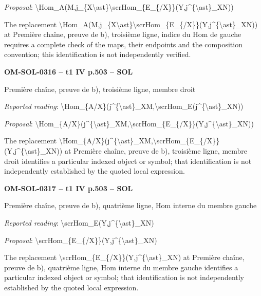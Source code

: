 \emph{Proposal}: \textbackslash{}Hom\_A(M,j\_\{X\textbackslash{}ast\}\textbackslash{}scrHom\_\{E\_\{/X\}\}(Y,j\textasciicircum{}\{\textbackslash{}ast\}\_XN))\par
The replacement \textbackslash{}Hom\_A(M,j\_\{X\textbackslash{}ast\}\textbackslash{}scrHom\_\{E\_\{/X\}\}(Y,j\textasciicircum{}\{\textbackslash{}ast\}\_XN)) at Première chaîne, preuve de b), troisième ligne, indice du Hom de gauche requires a complete check of the maps, their endpoints and the composition convention; this identification is not independently verified.\par
\par\noindent\textbf{OM-SOL-0316 -- t1 IV p.503 -- SOL}\par
Première chaîne, preuve de b), troisième ligne, membre droit\par
\emph{Reported reading}: \textbackslash{}Hom\_\{A/X\}(j\textasciicircum{}\{\textbackslash{}ast\}\_XM,\textbackslash{}scrHom\_E(j\textasciicircum{}\{\textbackslash{}ast\}\_XN))\par
\emph{Proposal}: \textbackslash{}Hom\_\{A/X\}(j\textasciicircum{}\{\textbackslash{}ast\}\_XM,\textbackslash{}scrHom\_\{E\_\{/X\}\}(Y,j\textasciicircum{}\{\textbackslash{}ast\}\_XN))\par
The replacement \textbackslash{}Hom\_\{A/X\}(j\textasciicircum{}\{\textbackslash{}ast\}\_XM,\textbackslash{}scrHom\_\{E\_\{/X\}\}(Y,j\textasciicircum{}\{\textbackslash{}ast\}\_XN)) at Première chaîne, preuve de b), troisième ligne, membre droit identifies a particular indexed object or symbol; that identification is not independently established by the quoted local expression.\par
\par\noindent\textbf{OM-SOL-0317 -- t1 IV p.503 -- SOL}\par
Première chaîne, preuve de b), quatrième ligne, Hom interne du membre gauche\par
\emph{Reported reading}: \textbackslash{}scrHom\_E(Y,j\textasciicircum{}\{\textbackslash{}ast\}\_XN)\par
\emph{Proposal}: \textbackslash{}scrHom\_\{E\_\{/X\}\}(Y,j\textasciicircum{}\{\textbackslash{}ast\}\_XN)\par
The replacement \textbackslash{}scrHom\_\{E\_\{/X\}\}(Y,j\textasciicircum{}\{\textbackslash{}ast\}\_XN) at Première chaîne, preuve de b), quatrième ligne, Hom interne du membre gauche identifies a particular indexed object or symbol; that identification is not independently established by the quoted local expression.\par
